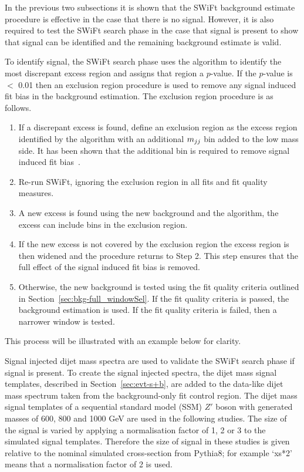 In the previous two subsections it is shown that the SWiFt background estimate procedure is effective in the case that there is no signal.
However, it is also required to test the SWiFt search phase in the case that signal is present to show that signal can be identified and the remaining background estimate is valid.

To identify signal, the SWiFt search phase uses the \bh{} algorithm to identify the most discrepant excess region and assigns that region a \mbox{$p$-value}.
If the \mbox{$p$-value} is $<$ 0.01 then an exclusion region procedure is used to remove any signal induced fit bias in the background estimation.
The exclusion region procedure is as follows.
\vspace{-0.25em}
\begin{enumerate}[leftmargin=*]
\item If a discrepant excess is found, define an exclusion region as the excess
  region identified by the \bh{} algorithm with an additional $m_{jj}$ bin added to the low mass side.
  It has been shown that the additional bin is required to remove signal induced fit bias~\cite{dijet-mori16_paper}.
\item Re-run SWiFt, ignoring the exclusion region in all fits and fit quality measures.
\item A new excess is found using the new background and the \bh{} algorithm,
  the excess can include bins in the exclusion region.
\item If the new excess is not covered by the exclusion region the excess region is then widened and the procedure returns to Step 2.
  This step ensures that the full effect of the signal induced fit bias is removed.
\item Otherwise, the new background is tested using the fit quality criteria outlined in Section~\ref{sec:bkg-full_windowSel}.
  If the fit quality criteria is passed, the background estimation is used.
  If the fit quality criteria is failed, then a narrower window is tested.
\end{enumerate}
\vspace{-0.25em}
This process will be illustrated with an example below for clarity.

Signal injected dijet mass spectra are used to validate the SWiFt search phase if signal is present.
To create the signal injected spectra, the dijet mass signal templates, described in Section~\ref{sec:evt-s+b},
are added to the data-like dijet mass spectrum taken from the background-only fit control region.
The dijet mass signal templates of a sequential standard model (SSM) $Z'$ boson with generated masses of 600, 800 and 1000 GeV are used in the following studies.
The size of the signal is varied by applying a normalisation factor of 1, 2 or 3 to the simulated signal templates.
Therefore the size of signal in these studies is given relative to the nominal simulated cross-section from {\sc Pythia8};
for example `xs*2' means that a normalisation factor of 2 is used.

